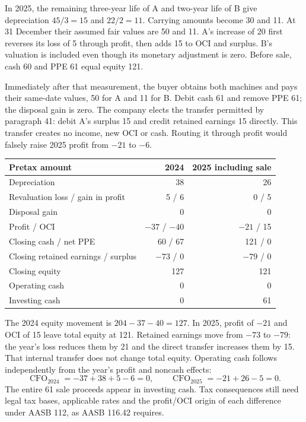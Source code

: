 In 2025, the remaining three-year life of A and two-year life of B give
depreciation $45/3=15$ and $22/2=11$. Carrying amounts become 30 and 11.
At 31 December their assumed fair values are 50 and 11. A's increase of
20 first reverses its loss of 5 through profit, then adds 15 to OCI and
surplus. B's valuation is included even though its monetary adjustment is
zero. Before sale, cash 60 and PPE 61 equal equity 121.

Immediately after that measurement, the buyer obtains both machines and pays
their same-date values, 50 for A and 11 for B. Debit cash 61 and remove PPE
61; the disposal gain is zero. The company elects the transfer permitted by paragraph 41:
debit A's surplus 15 and credit retained earnings 15 directly. This transfer
creates no income, new OCI or cash. Routing it through profit would falsely
raise 2025 profit from $-21$ to $-6$.

\begin{center}
\begin{tabular}{@{}lrr@{}}
\toprule
Pretax amount & 2024 & 2025 including sale\\
\midrule
Depreciation & 38 & 26\\
Revaluation loss / gain in profit & 5 / 6 & 0 / 5\\
Disposal gain & 0 & 0\\
Profit / OCI & $-37$ / $-40$ & $-21$ / 15\\
Closing cash / net PPE & 60 / 67 & 121 / 0\\
Closing retained earnings / surplus & $-73$ / 0 & $-79$ / 0\\
Closing equity & 127 & 121\\
Operating cash & 0 & 0\\
Investing cash & 0 & 61\\
\bottomrule
\end{tabular}
\end{center}

The 2024 equity movement is $204-37-40=127$. In 2025, profit of $-21$
and OCI of 15 leave total equity at 121. Retained earnings move from $-73$
to $-79$: the year's loss reduces them by 21 and the direct transfer increases
them by 15. That internal transfer does not change total equity. Operating
cash follows independently from the year's profit and noncash effects:
\[
 \operatorname{CFO}_{2024}=-37+38+5-6=0,\qquad
 \operatorname{CFO}_{2025}=-21+26-5=0.
\]
The entire 61 sale proceeds appear in investing cash. Tax consequences still
need legal tax bases, applicable rates and the profit/OCI origin of each
difference under AASB 112, as AASB 116.42 requires.

